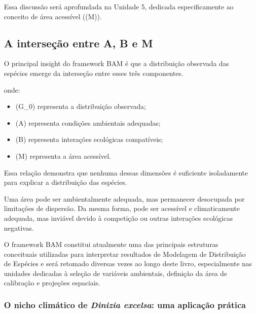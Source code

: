 Essa discussão será aprofundada na Unidade 5, dedicada especificamente ao conceito de área acessível ((M)).

\subsection{A interseção entre A, B e M}

O principal insight do framework BAM é que a distribuição observada das espécies emerge da interseção entre esses três componentes.

\begin{equationbox}
\end{equationbox}

onde:

\begin{itemize}
	
	\item (G_0) representa a distribuição observada;
	
	\item (A) representa condições ambientais adequadas;
	
	\item (B) representa interações ecológicas compatíveis;
	
	\item (M) representa a área acessível.
	
\end{itemize}

Essa relação demonstra que nenhuma dessas dimensões é suficiente isoladamente para explicar a distribuição das espécies.

Uma área pode ser ambientalmente adequada, mas permanecer desocupada por limitações de dispersão. Da mesma forma, pode ser acessível e climaticamente adequada, mas inviável devido à competição ou outras interações ecológicas negativas.

O framework BAM constitui atualmente uma das principais estruturas conceituais utilizadas para interpretar resultados de Modelagem de Distribuição de Espécies e será retomado diversas vezes ao longo deste livro, especialmente nas unidades dedicadas à seleção de variáveis ambientais, definição da área de calibração e projeções espaciais.


\subsubsection{O nicho climático de \textit{Dinizia excelsa}: uma aplicação prática}

